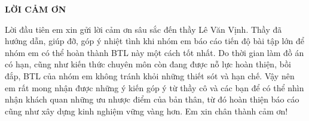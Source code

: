 \documentclass[../BTL.tex]{subfiles}
\begin{document}
\begin{center}
    \Large{\textbf{LỜI CẢM ƠN}}\\
\end{center}
\vspace{1cm}
Lời đầu tiên em xin gửi lời cảm ơn sâu sắc đến thầy Lê Văn Vịnh. Thầy đã hướng dẫn, giúp đỡ, góp ý nhiệt tình khi nhóm em báo cáo tiến độ bài tập lớn để nhóm em có thể hoàn thành BTL này một cách tốt nhất. Do thời gian làm đồ án có hạn, cũng như kiến thức chuyên môn còn đang được nỗ lực hoàn thiện, bồi đắp, BTL của nhóm em không tránh khỏi những thiết sót và hạn chế. Vậy nên em rất mong nhận được những ý kiến góp ý từ thầy cô và các bạn để có thể nhìn nhận khách quan những ưu nhược điểm của bản thân, từ đó hoàn thiện báo cáo cũng như xây dựng kinh nghiệm vững vàng hơn. Em xin chân thành cảm ơn!
\end{document}
